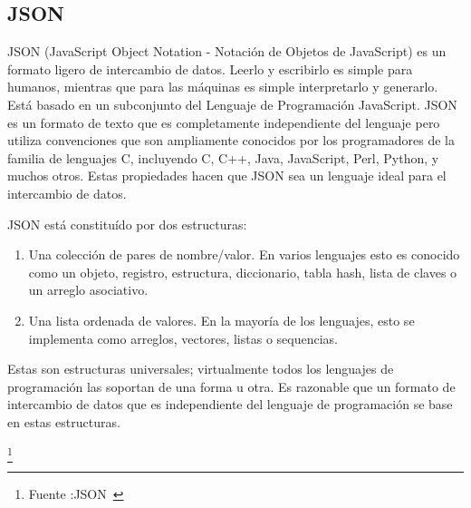\subsection{JSON}
\label{json}
JSON (JavaScript Object Notation - Notación de Objetos de JavaScript) 
es un formato ligero de intercambio de datos. Leerlo y escribirlo es simple
 para humanos, mientras que para las máquinas es simple interpretarlo y 
generarlo. Está basado en un subconjunto del Lenguaje de Programación
 JavaScript. JSON es un formato de texto que es completamente independiente
 del lenguaje pero utiliza convenciones que son ampliamente conocidos por los
 programadores de la familia de lenguajes C, incluyendo C, C++, Java, 
JavaScript, Perl, Python, y muchos otros. Estas propiedades hacen que 
JSON sea un lenguaje ideal para el intercambio de datos.

JSON está constituído por dos estructuras:
\begin{enumerate}

\item Una colección de pares de nombre/valor. En varios lenguajes 
esto es conocido como un objeto, registro, estructura, diccionario, 
tabla hash, lista de claves o un arreglo asociativo.
\item Una lista ordenada de valores. En la mayoría de los lenguajes, 
esto se implementa como arreglos, vectores, listas o sequencias.
\end{enumerate}
Estas son estructuras universales; virtualmente todos los lenguajes 
de programación las soportan de una forma u otra. Es razonable que
 un formato de intercambio de datos que es independiente del lenguaje 
de programación se base en estas estructuras.

\footnote{Fuente :JSON~\cite{JSON}}